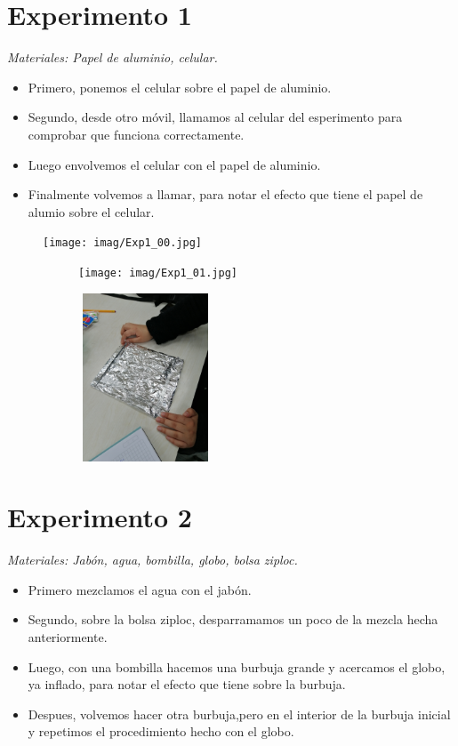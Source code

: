 \documentclass[a4paper,12pt]{article}
\begin{document}
\section*{Experimento 1}
\textit{Materiales: Papel de aluminio, celular.}
\begin{itemize}
    \item Primero, ponemos el celular sobre el papel de aluminio.
    \item Segundo, desde otro móvil, llamamos al celular del esperimento para comprobar que funciona correctamente.
    \item Luego envolvemos el celular con el papel de aluminio.
    \item Finalmente volvemos a llamar, para notar el efecto que tiene el papel de alumio sobre el celular.
\end{itemize}
\begin{figure}[h]
    \begin{subfigure}
        \raggedright
        \texttt{[image: imag/Exp1\_00.jpg]}
        \end{subfigure}
    \begin{subfigure}
        \centering
        \texttt{[image: imag/Exp1\_01.jpg]}
    \end{subfigure}
    \begin{subfigure}
        \raggedleft
        \includegraphics[width=4cm, height=5cm]{imag/Exp1_02.jpg}
    \end{subfigure}
\end{figure}

\section*{Experimento 2}
\textit{Materiales: Jabón, agua, bombilla, globo, bolsa ziploc.}
\begin{itemize}
    \item Primero mezclamos el agua con el jabón.
    \item Segundo, sobre la bolsa ziploc, desparramamos un poco de la mezcla hecha anteriormente.
    \item Luego, con una bombilla hacemos una burbuja grande y acercamos el globo, ya inflado, para notar el efecto que tiene sobre la burbuja.
    \item Despues, volvemos hacer otra burbuja,pero en el interior de la burbuja inicial y repetimos el procedimiento hecho con el globo.
\end{itemize}
\end{document}

